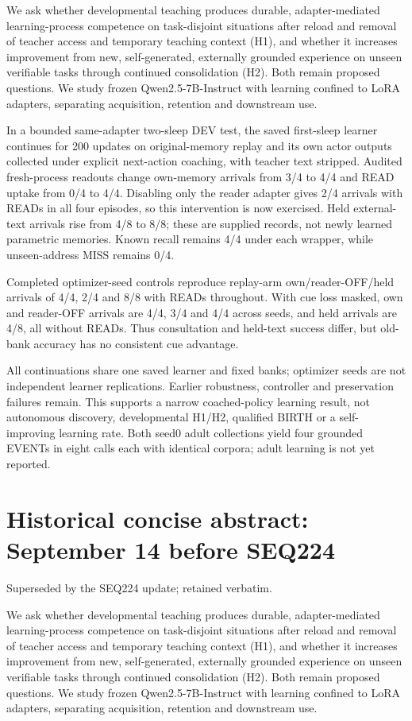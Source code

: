 \documentclass[11pt]{article}
\begin{document}
We ask whether developmental teaching produces durable, adapter-mediated
learning-process competence on task-disjoint situations after reload and
removal of teacher access and temporary teaching context (H1), and whether it
increases improvement from new, self-generated, externally grounded experience
on unseen verifiable tasks through continued consolidation (H2). Both remain
proposed questions. We study frozen Qwen2.5-7B-Instruct with learning confined
to LoRA adapters, separating acquisition, retention and downstream use.

In a bounded same-adapter two-sleep DEV test, the saved first-sleep learner
continues for 200 updates on original-memory replay and its own actor outputs
collected under explicit next-action coaching, with teacher text stripped.
Audited fresh-process readouts change own-memory arrivals from 3/4 to 4/4 and
READ uptake from 0/4 to 4/4. Disabling only the reader adapter gives 2/4 arrivals
with READs in all four episodes, so this intervention is now exercised.
Held external-text arrivals rise from 4/8 to 8/8; these are supplied records,
not newly learned parametric memories. Known recall remains 4/4 under each
wrapper, while unseen-address MISS remains 0/4.

Completed optimizer-seed controls reproduce replay-arm own/reader-OFF/held
arrivals of 4/4, 2/4 and 8/8 with READs throughout. With cue loss masked,
own and reader-OFF arrivals are 4/4, 3/4 and 4/4 across seeds, and held arrivals
are 4/8, all without READs. Thus consultation and held-text success differ,
but old-bank accuracy has no consistent cue advantage.

All continuations share one saved learner and fixed banks; optimizer seeds
are not independent learner replications. Earlier robustness, controller and
preservation failures remain. This supports a narrow coached-policy learning
result, not autonomous discovery, developmental H1/H2, qualified BIRTH or a
self-improving learning rate. Both seed0 adult collections yield four grounded
EVENTs in eight calls each with identical corpora; adult learning is not yet reported.

\section*{Historical concise abstract: September 14 before SEQ224}
\noindent Superseded by the SEQ224 update; retained verbatim.

We ask whether developmental teaching produces durable, adapter-mediated
learning-process competence on task-disjoint situations after reload and
removal of teacher access and temporary teaching context (H1), and whether it
increases improvement from new, self-generated, externally grounded experience
on unseen verifiable tasks through continued consolidation (H2). Both remain
proposed questions. We study frozen Qwen2.5-7B-Instruct with learning confined
to LoRA adapters, separating acquisition, retention and downstream use.
\end{document}
